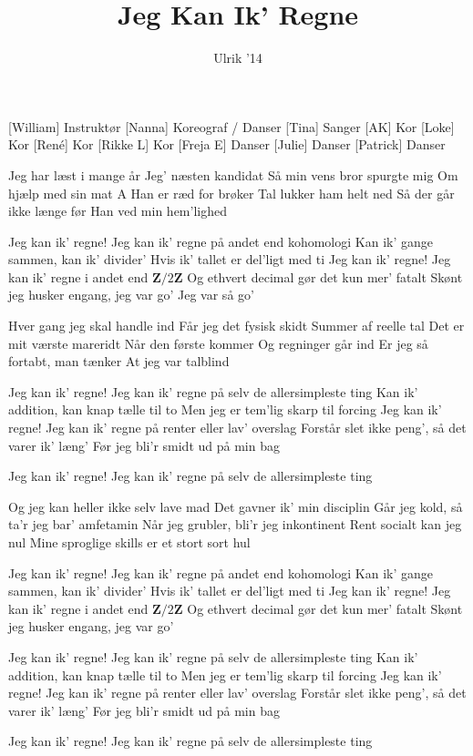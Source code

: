 \documentclass[a4paper,11pt]{article}
\title{Jeg Kan Ik' Regne}
\author{Ulrik '14}
\begin{document}
\maketitle

\begin{roles}
[William] Instruktør
[Nanna] Koreograf / Danser
[Tina] Sanger
[AK] Kor
[Loke] Kor
[René] Kor
[Rikke L] Kor
[Freja E] Danser
[Julie] Danser
[Patrick] Danser
\end{roles}

\begin{song}
 Jeg har læst i mange år
Jeg' næsten kandidat
Så min vens bror spurgte mig
Om hjælp med sin mat A
Han er ræd for brøker
Tal lukker ham helt ned
Så der går ikke længe før
Han ved min hem'lighed

 Jeg kan ik' regne!
Jeg kan ik' regne på andet end kohomologi
Kan ik' gange sammen, kan ik' divider'
Hvis ik' tallet er del'ligt med ti
Jeg kan ik' regne!
Jeg kan ik' regne i andet end $\textbf{Z} / 2\textbf{Z}$
Og ethvert decimal gør det kun mer' fatalt
Skønt jeg husker engang, jeg var go'
Jeg var så go'

 Hver gang jeg skal handle ind
Får jeg det fysisk skidt
Summer af reelle tal
Det er mit værste mareridt
Når den første kommer
Og regninger går ind
Er jeg så fortabt, man tænker
At jeg var talblind

 Jeg kan ik' regne!
Jeg kan ik' regne på selv de allersimpleste ting
Kan ik' addition, kan knap tælle til to
Men jeg er tem'lig skarp til forcing
Jeg kan ik' regne!
Jeg kan ik' regne på renter eller lav' overslag
Forstår slet ikke peng', så det varer ik' læng'
Før jeg bli'r smidt ud på min bag

 Jeg kan ik' regne!
Jeg kan ik' regne på selv de allersimpleste ting

 Og jeg kan heller ikke selv lave mad
Det gavner ik' min disciplin
Går jeg kold, så ta'r jeg bar' amfetamin
Når jeg grubler, bli'r jeg inkontinent
Rent socialt kan jeg nul
Mine sproglige skills er et stort sort hul

 Jeg kan ik' regne!
Jeg kan ik' regne på andet end kohomologi
Kan ik' gange sammen, kan ik' divider'
Hvis ik' tallet er del'ligt med ti
Jeg kan ik' regne!
Jeg kan ik' regne i andet end $\textbf{Z} / 2\textbf{Z}$
Og ethvert decimal gør det kun mer' fatalt
Skønt jeg husker engang, jeg var go'

 Jeg kan ik' regne!
Jeg kan ik' regne på selv de allersimpleste ting
Kan ik' addition, kan knap tælle til to
Men jeg er tem'lig skarp til forcing
Jeg kan ik' regne!
Jeg kan ik' regne på renter eller lav' overslag
Forstår slet ikke peng', så det varer ik' læng'
Før jeg bli'r smidt ud på min bag

 Jeg kan ik' regne!
Jeg kan ik' regne på selv de allersimpleste ting
\end{song}
\end{document}
